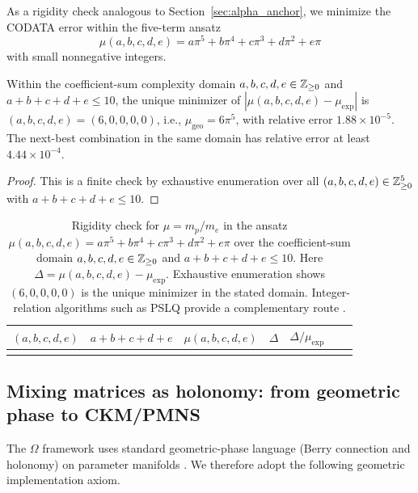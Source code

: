 As a rigidity check analogous to Section~\ref{sec:alpha_anchor}, we minimize the CODATA error within the five-term ansatz
\begin{equation}
\mu(a,b,c,d,e)=a\pi^5+b\pi^4+c\pi^3+d\pi^2+e\pi
\end{equation}
with small nonnegative integers.

\begin{proposition}\label{prop:mu_integer_rigidity}
Within the coefficient-sum complexity domain $a,b,c,d,e\in\mathbb{Z}_{\ge 0}$ and $a+b+c+d+e\le 10$, the unique minimizer of $|\mu(a,b,c,d,e)-\mu_{\mathrm{exp}}|$ is $(a,b,c,d,e)=(6,0,0,0,0)$, i.e., $\mu_{\mathrm{geo}}=6\pi^5$, with relative error $1.88\times 10^{-5}$. The next-best combination in the same domain has relative error at least $4.44\times 10^{-4}$.
\end{proposition}
\begin{proof}
This is a finite check by exhaustive enumeration over all $(a,b,c,d,e)\in\mathbb{Z}_{\ge 0}^5$ with $a+b+c+d+e\le 10$.
\end{proof}

\begin{table}[t]
\centering
\begin{tabular}{@{}rrrrrrr@{}}
\toprule
$(a,b,c,d,e)$ & $a{+}b{+}c{+}d{+}e$ & $\mu(a,b,c,d,e)$ & $\Delta$ & $\Delta/\mu_{\mathrm{exp}}$ \\
\midrule
%
\\
\bottomrule
\end{tabular}
\caption{Rigidity check for $\mu=m_p/m_e$ in the ansatz $\mu(a,b,c,d,e)=a\pi^5+b\pi^4+c\pi^3+d\pi^2+e\pi$ over the coefficient-sum domain $a,b,c,d,e\in\mathbb{Z}_{\ge 0}$ and $a{+}b{+}c{+}d{+}e\le 10$. Here $\Delta=\mu(a,b,c,d,e)-\mu_{\mathrm{exp}}$. Exhaustive enumeration shows $(6,0,0,0,0)$ is the unique minimizer in the stated domain. Integer-relation algorithms such as PSLQ provide a complementary route \cite{FergusonBaileyArno1999}.}
\label{tab:mu_integer_search}
\end{table}

\subsection{Mixing matrices as holonomy: from geometric phase to CKM/PMNS}
The $\Omega$ framework uses standard geometric-phase language (Berry connection and holonomy) on parameter manifolds \cite{Simon1983,Berry1984,WilczekZee1984,Nakahara2003}. We therefore adopt the following geometric implementation axiom.

